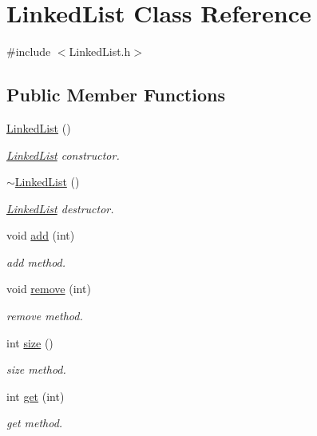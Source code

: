 \hypertarget{classLinkedList}{}\section{Linked\+List Class Reference}
\label{classLinkedList}


{\ttfamily \#include $<$Linked\+List.\+h$>$}

\subsection*{Public Member Functions}
\begin{DoxyCompactItemize}
\item 
\hyperlink{classLinkedList_afe7f78983e173f8018927cf2ad11a5aa}{Linked\+List} ()
\begin{DoxyCompactList}\small\item\em \hyperlink{classLinkedList}{Linked\+List} constructor. \end{DoxyCompactList}\item 
\hyperlink{classLinkedList_a35811ed58ff0d8d9cc9b309b8d8f5111}{$\sim$\+Linked\+List} ()
\begin{DoxyCompactList}\small\item\em \hyperlink{classLinkedList}{Linked\+List} destructor. \end{DoxyCompactList}\item 
void \hyperlink{classLinkedList_afe1904ffe05ef5a9c80be00fd920ab81}{add} (int)
\begin{DoxyCompactList}\small\item\em add method. \end{DoxyCompactList}\item 
void \hyperlink{classLinkedList_aeb436e928e809afd59ec063426015d41}{remove} (int)
\begin{DoxyCompactList}\small\item\em remove method. \end{DoxyCompactList}\item 
int \hyperlink{classLinkedList_a4224bd8bf5f18b7b6f9fa66ee2c35702}{size} ()
\begin{DoxyCompactList}\small\item\em size method. \end{DoxyCompactList}\item 
int \hyperlink{classLinkedList_aeed8f219fd2a19fe22627eba351cb87d}{get} (int)
\begin{DoxyCompactList}\small\item\em get method. \end{DoxyCompactList}\end{DoxyCompactItemize}


